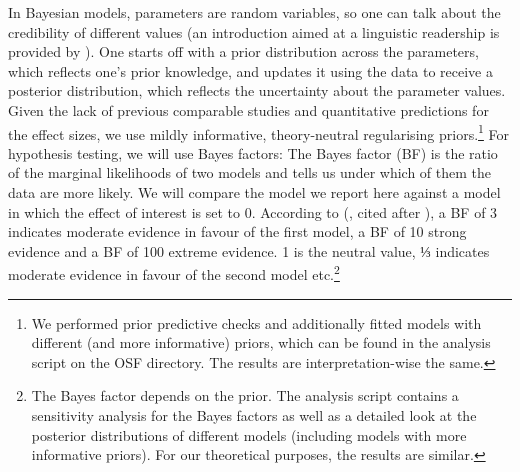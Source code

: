 \documentclass[output=paper,colorlinks,citecolor=brown]{langscibook}
\begin{document}
In Bayesian models, parameters are random variables, so one can talk about the credibility of different values (an introduction aimed at a linguistic readership is provided by \citealt{nicenboim_introduction_2024}).
One starts off with a prior distribution across the parameters, which reflects one's prior knowledge, and updates it using the data to receive a posterior distribution, which reflects the uncertainty about the parameter values.
Given the lack of previous comparable studies and quantitative predictions for the effect sizes, we use mildly informative, theory-neutral regularising priors.\footnote{We performed prior predictive checks and additionally fitted models with different (and more informative) priors, which can be found in the analysis script on the OSF directory. The results are interpretation-wise the same.}
For hypothesis testing, we will use Bayes factors: The Bayes factor (BF) is the ratio of the marginal likelihoods of two models and tells us under which of them the data are more likely.
We will compare the model we report here against a model in which the effect of interest is set to 0.
According to \citeauthor{jeffreys_theory_1939} (\citeyear{jeffreys_theory_1939}, cited after \citealt{nicenboim_introduction_2024}), a BF of 3 indicates moderate evidence in favour of the first model, a BF of 10 strong evidence and a BF of 100 extreme evidence.
1 is the neutral value, ⅓ indicates moderate evidence in favour of the second model etc.\footnote{The Bayes factor depends on the prior. The analysis script contains a sensitivity analysis for the Bayes factors as well as a detailed look at the posterior distributions of different models (including models with more informative priors). For our theoretical purposes, the results are similar.}
\end{document}

